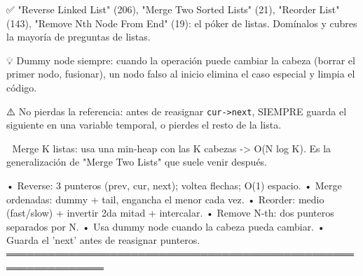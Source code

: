 \begin{dsaentrevistas}

✅ "Reverse Linked List" (206), "Merge Two Sorted Lists" (21), "Reorder
   List" (143), "Remove Nth Node From End" (19): el póker de listas.
   Domínalos y cubres la mayoría de preguntas de listas.

💡 Dummy node siempre: cuando la operación puede cambiar la cabeza
   (borrar el primer nodo, fusionar), un nodo falso al inicio elimina el
   caso especial y limpia el código.

⚠️ No pierdas la referencia: antes de reasignar \verb|cur->next|,
   SIEMPRE guarda el siguiente en una variable temporal, o pierdes el
   resto de la lista.

🔑 Merge K listas: usa una min-heap con las K cabezas -> O(N log K). Es
   la generalización de "Merge Two Lists" que suele venir después.

\end{dsaentrevistas}

\begin{dsaresumen}

• Reverse: 3 punteros (prev, cur, next); voltea flechas; O(1) espacio.
• Merge ordenadas: dummy + tail, engancha el menor cada vez.
• Reorder: medio (fast/slow) + invertir 2da mitad + intercalar.
• Remove N-th: dos punteros separados por N.
• Usa dummy node cuando la cabeza pueda cambiar.
• Guarda el 'next' antes de reasignar punteros.
════════════════════════════════════════════════════════════════

\end{dsaresumen}
